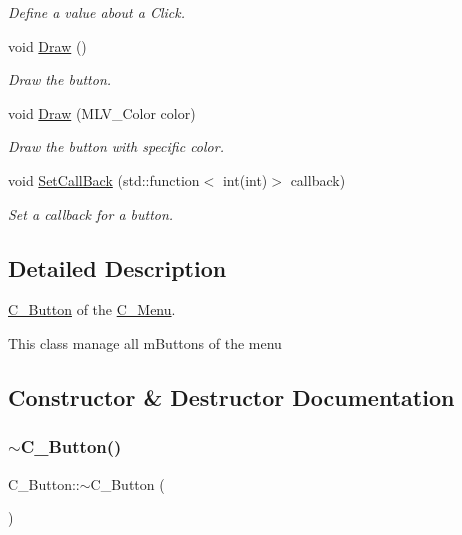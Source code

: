 \begin{DoxyCompactItemize}
\begin{DoxyCompactList}\small\item\em Define a value about a Click. \end{DoxyCompactList}\item 
void \hyperlink{classC__Button_a71f9a7d92a30818af1539104e6b963fb}{Draw} ()
\begin{DoxyCompactList}\small\item\em Draw the button. \end{DoxyCompactList}\item 
void \hyperlink{classC__Button_a6c507d4567ca21676e9980f8cf3d26b5}{Draw} (M\+L\+V\+\_\+\+Color color)
\begin{DoxyCompactList}\small\item\em Draw the button with specific color. \end{DoxyCompactList}\item 
void \hyperlink{classC__Button_aedb01f3229d8176f6a9475cf2edae8f0}{Set\+Call\+Back} (std\+::function$<$ int(int)$>$ callback)
\begin{DoxyCompactList}\small\item\em Set a callback for a button. \end{DoxyCompactList}\end{DoxyCompactItemize}


\subsection{Detailed Description}
\hyperlink{classC__Button}{C\+\_\+\+Button} of the \hyperlink{classC__Menu}{C\+\_\+\+Menu}. 

This class manage all m\+Buttons of the menu 

\subsection{Constructor \& Destructor Documentation}
\mbox{\label{classC__Button_a8581fb2ad14e232e97040388bdc992e4}} 
\subsubsection{\texorpdfstring{$\sim$\+C\+\_\+\+Button()}{~C\_Button()}\hspace{0.1cm}{\footnotesize\ttfamily [1/2]}}
{\footnotesize\ttfamily C\+\_\+\+Button\+::$\sim$\+C\+\_\+\+Button (\begin{DoxyParamCaption}{ }\end{DoxyParamCaption})\hspace{0.3cm}{\ttfamily [default]}}



